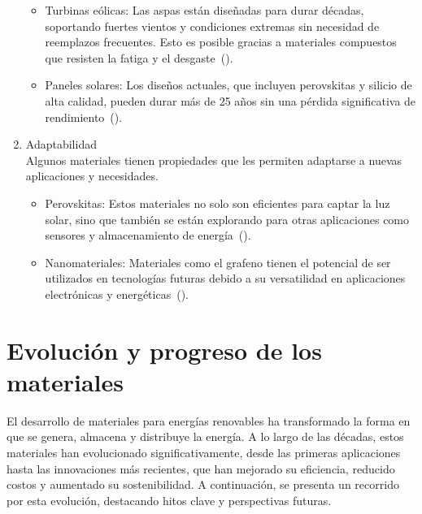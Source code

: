 \documentclass[letterpaper, 12pt]{article}
\begin{document}
\begin{enumerate}
            \begin{itemize}
                  \item Turbinas eólicas: Las aspas están diseñadas para durar décadas, soportando
                        fuertes vientos y condiciones extremas sin necesidad de reemplazos frecuentes.
                        Esto es posible gracias a materiales compuestos que resisten la fatiga y el
                        desgaste~(\cite{ColinLuna_deLeoWinkler_nd}).
                  \item Paneles solares: Los diseños actuales, que incluyen perovskitas y silicio de
                        alta calidad, pueden durar más de 25 años sin una pérdida significativa de
                        rendimiento~(\cite{Ebhota_Jen2019}).
            \end{itemize}

      \item Adaptabilidad \\ Algunos materiales tienen propiedades que les permiten
            adaptarse a nuevas aplicaciones y necesidades.
            \begin{itemize}
                  \item Perovskitas: Estos materiales no solo son eficientes para captar la luz solar,
                        sino que también se están explorando para otras aplicaciones como sensores y
                        almacenamiento de energía~(\cite{Abera2023}).
                  \item Nanomateriales: Materiales como el grafeno tienen el potencial de ser
                        utilizados en tecnologías futuras debido a su versatilidad en aplicaciones
                        electrónicas y energéticas~(\cite{Uyor2021}).
            \end{itemize}
\end{enumerate}

\section{Evolución y progreso de los materiales}

El desarrollo de materiales para energías renovables ha transformado la forma
en que se genera, almacena y distribuye la energía. A lo largo de las décadas,
estos materiales han evolucionado significativamente, desde las primeras
aplicaciones hasta las innovaciones más recientes, que han mejorado su
eficiencia, reducido costos y aumentado su sostenibilidad. A continuación, se
presenta un recorrido por esta evolución, destacando hitos clave y perspectivas
futuras.
\end{document}
